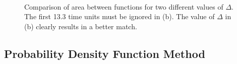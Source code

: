 \documentclass[a4paper,11pt]{article}
\begin{document}
   \begin{figure}
   \\
   \caption{Comparison of area between functions for two different values of
   $\Delta$. The first 13.3 time units must be ignored in (b). The value of
   $\Delta$ in (b) clearly results in a better match.}
   \label{fig:areamethod}
   \end{figure}
\subsection{Probability Density Function Method}
\label{sec-5-2}
\end{document}
